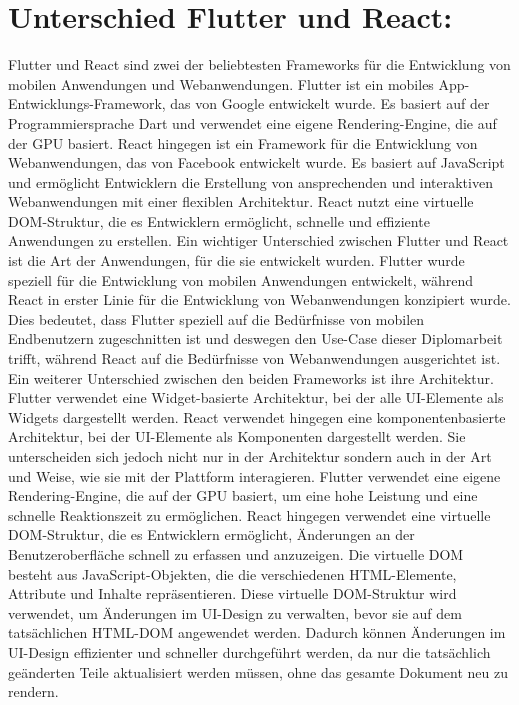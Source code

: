 \section{Unterschied Flutter und React:}
Flutter und React sind zwei der beliebtesten Frameworks für die Entwicklung von mobilen Anwendungen und Webanwendungen. 
Flutter ist ein mobiles App-Entwicklungs-Framework, das von Google entwickelt wurde. 
Es basiert auf der Programmiersprache Dart und verwendet eine eigene Rendering-Engine, die auf der GPU basiert. 
React hingegen ist ein Framework für die Entwicklung von Webanwendungen, das von Facebook entwickelt wurde. Es basiert auf JavaScript und ermöglicht Entwicklern die Erstellung von ansprechenden und interaktiven \newline 
Webanwendungen mit einer flexiblen Architektur. 
React nutzt eine virtuelle DOM-Struktur, die es Entwicklern ermöglicht, schnelle und effiziente Anwendungen zu erstellen. 
Ein wichtiger Unterschied zwischen Flutter und React ist die Art der Anwendungen, für die sie entwickelt wurden. 
Flutter wurde speziell für die Entwicklung von mobilen Anwendungen entwickelt, während React in erster Linie für die Entwicklung von Webanwendungen konzipiert wurde. 
\newline
Dies bedeutet, dass Flutter speziell auf die Bedürfnisse von mobilen Endbenutzern zugeschnitten ist und deswegen den Use-Case dieser Diplomarbeit trifft, während React auf die Bedürfnisse von Webanwendungen ausgerichtet ist.
Ein weiterer Unterschied zwischen den beiden Frameworks ist ihre Architektur. 
Flutter verwendet eine Widget-basierte Architektur, bei der alle UI-Elemente als Widgets dargestellt werden.  
React verwendet hingegen eine komponentenbasierte Architektur, bei der UI-Elemente als Komponenten dargestellt werden.
Sie unterscheiden sich jedoch nicht nur in der Architektur sondern auch in der Art und Weise, wie sie mit der Plattform interagieren. 
Flutter verwendet eine eigene Rendering-Engine, die auf der GPU basiert, um eine hohe Leistung und eine schnelle Reaktionszeit zu ermöglichen.
React hingegen verwendet eine virtuelle DOM-Struktur, die es Entwicklern ermöglicht, Änderungen an der \newpage 
Benutzeroberfläche schnell zu erfassen und anzuzeigen. 
Die virtuelle DOM besteht aus JavaScript-Objekten, die die verschiedenen HTML-Elemente, Attribute und Inhalte repräsentieren. 
Diese virtuelle DOM-Struktur wird verwendet, um Änderungen im UI-Design zu verwalten, bevor sie auf dem tatsächlichen HTML-DOM angewendet werden. 
Dadurch können Änderungen im UI-Design effizienter und schneller durchgeführt werden, da nur die tatsächlich geänderten Teile aktualisiert werden müssen, ohne das gesamte Dokument neu zu rendern. 
